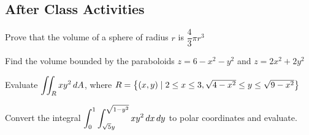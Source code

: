 \documentclass[notes]{subfiles}
\begin{document}
	\subsection*{After Class Activities}
		\begin{ex}
			Prove that the volume of a sphere of radius $r$ is $\dfrac{4}{3}\pi r^3$
		\end{ex}
		
		\begin{ex}
			Find the volume bounded by the paraboloids $z = 6-x^2-y^2$ and $z = 2x^2 + 2y^2$
		\end{ex}
		
		\begin{ex}
			Evaluate $\displaystyle \iint_R xy^2\, dA$, where $R = \left\lbrace (x,y)\mid 2\leq x\leq 3, \sqrt{4-x^2}\leq y\leq \sqrt{9-x^2}  \right\rbrace$
		\end{ex}
		
		\begin{ex}
			Convert the integral $\displaystyle \int_0^{1}\int_{\sqrt{5}y}^{\sqrt{1-y^2}}xy^2\,dx\,dy$ to polar coordinates and evaluate.
		\end{ex}
	
	\clearpage
\end{document}
